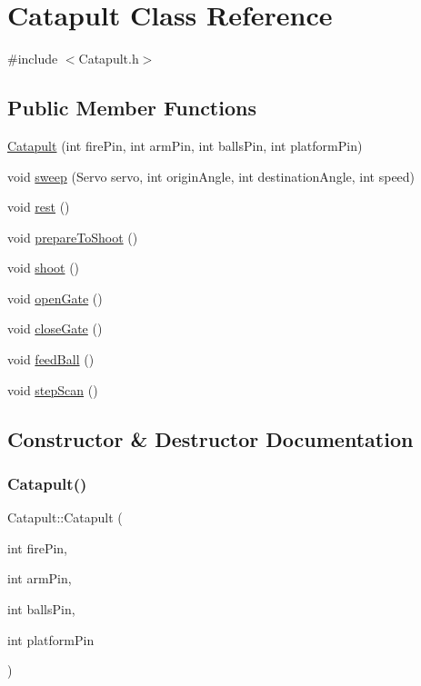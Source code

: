 \hypertarget{class_catapult}{}\section{Catapult Class Reference}
\label{class_catapult}


{\ttfamily \#include $<$Catapult.\+h$>$}

\subsection*{Public Member Functions}
\begin{DoxyCompactItemize}
\item 
\hyperlink{class_catapult_abac7199aa72bdd69ec98034f7c73fb07}{Catapult} (int fire\+Pin, int arm\+Pin, int balls\+Pin, int platform\+Pin)
\item 
void \hyperlink{class_catapult_ae6274ce7039929a6c9468aa9d5d763ef}{sweep} (Servo servo, int origin\+Angle, int destination\+Angle, int speed)
\item 
void \hyperlink{class_catapult_ae9673fabd4375317bebb257b64db4d84}{rest} ()
\item 
void \hyperlink{class_catapult_aad215c7a20a16a76a8cac9b9538a64ed}{prepare\+To\+Shoot} ()
\item 
void \hyperlink{class_catapult_a4a2ea0d327a135f6a5a2283436e1a99f}{shoot} ()
\item 
void \hyperlink{class_catapult_a67141918881d6bf8ddd171dc9eb8d87f}{open\+Gate} ()
\item 
void \hyperlink{class_catapult_a33ed3abd636cc9cdc267a9d06ef8d1db}{close\+Gate} ()
\item 
void \hyperlink{class_catapult_ab6f3cc1858e28ad31ecc4a26dfc0cd31}{feed\+Ball} ()
\item 
void \hyperlink{class_catapult_a739b4bb52e2a8529518226cd7e4bf8b1}{step\+Scan} ()
\end{DoxyCompactItemize}


\subsection{Constructor \& Destructor Documentation}
\mbox{\label{class_catapult_abac7199aa72bdd69ec98034f7c73fb07}} 
\subsubsection{\texorpdfstring{Catapult()}{Catapult()}}
{\footnotesize\ttfamily Catapult\+::\+Catapult (\begin{DoxyParamCaption}\item[{int}]{fire\+Pin,  }\item[{int}]{arm\+Pin,  }\item[{int}]{balls\+Pin,  }\item[{int}]{platform\+Pin }\end{DoxyParamCaption})}




